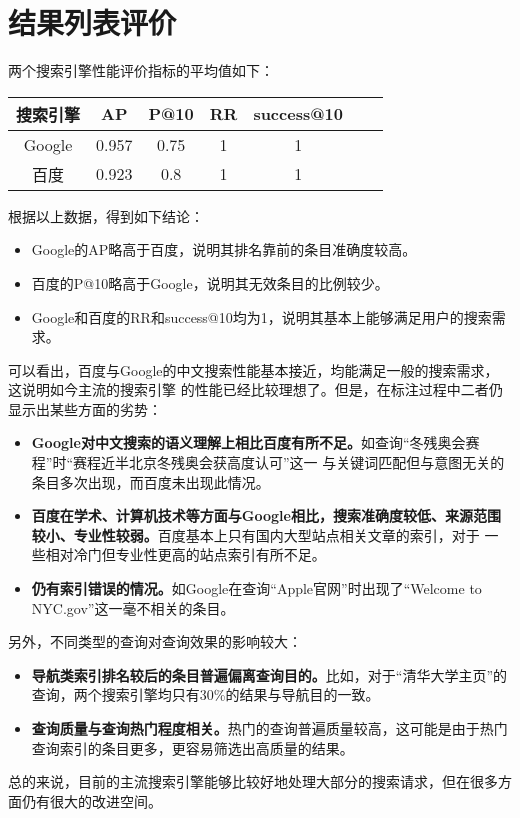 \documentclass[a4paper]{article}
\begin{document}
\section{结果列表评价}

两个搜索引擎性能评价指标的平均值如下：

\begin{center}
  \begin{tabular}{ |c|c|c|c|c|c|c| }
    \hline
    搜索引擎 & AP & P@10 & RR & success@10 \\ \hline
    Google & 0.957 & 0.75 & 1 & 1 \\ \hline
    百度 & 0.923 & 0.8 & 1 & 1 \\ \hline
  \end{tabular}
\end{center}

根据以上数据，得到如下结论：

\begin{itemize}
  \item Google的AP略高于百度，说明其排名靠前的条目准确度较高。
  \item 百度的P@10略高于Google，说明其无效条目的比例较少。
  \item Google和百度的RR和success@10均为1，说明其基本上能够满足用户的搜索需求。
\end{itemize}

可以看出，百度与Google的中文搜索性能基本接近，均能满足一般的搜索需求，这说明如今主流的搜索引擎
的性能已经比较理想了。但是，在标注过程中二者仍显示出某些方面的劣势：

\begin{itemize}
  \item \textbf{Google对中文搜索的语义理解上相比百度有所不足。}如查询“冬残奥会赛程”时“赛程近半北京冬残奥会获高度认可”这一
        与关键词匹配但与意图无关的条目多次出现，而百度未出现此情况。
  \item \textbf{百度在学术、计算机技术等方面与Google相比，搜索准确度较低、来源范围较小、专业性较弱。}百度基本上只有国内大型站点相关文章的索引，对于
        一些相对冷门但专业性更高的站点索引有所不足。
  \item \textbf{仍有索引错误的情况。}如Google在查询“Apple官网”时出现了“Welcome to NYC.gov”这一毫不相关的条目。
\end{itemize}

另外，不同类型的查询对查询效果的影响较大：

\begin{itemize}
  \item \textbf{导航类索引排名较后的条目普遍偏离查询目的。}比如，对于“清华大学主页”的查询，两个搜索引擎均只有30\%的结果与导航目的一致。
  \item \textbf{查询质量与查询热门程度相关。}热门的查询普遍质量较高，这可能是由于热门查询索引的条目更多，更容易筛选出高质量的结果。
\end{itemize}

总的来说，目前的主流搜索引擎能够比较好地处理大部分的搜索请求，但在很多方面仍有很大的改进空间。
\end{document}
